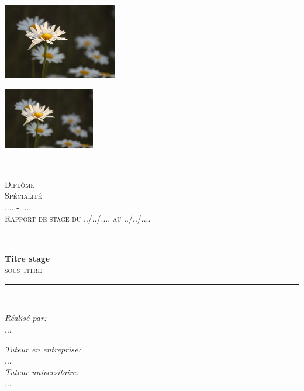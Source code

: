 \documentclass[french, a4paper, notitlepage, 12pt]{report}
\begin{document}
\begin{titlepage}
  \thispagestyle{empty}

  \begin{minipage}{0.45\textwidth}
    \begin{flushleft}
      \includegraphics[width=5cm]{img.jpg}
    \end{flushleft}
  \end{minipage}
  \begin{minipage}{0.45\textwidth}
    \begin{flushright}
      \includegraphics[width=4cm]{img.jpg}
    \end{flushright}
  \end{minipage}\\[3cm]

  \newcommand{\HRule}{\rule{\linewidth}{0.5mm}}
  \center

  \textsc{\Large Diplôme}\\
  \textsc{\Large Spécialité}\\
  \textsc{\large .... - ....}\\[2cm]
  \textsc{\Large Rapport de stage du ../../.... au ../../....}\\[.5cm]

  \HRule \\[0.4cm]
  { \huge \bfseries Titre stage}\\[0.1cm]
  \textsc{\large sous titre}\\
  \HRule \\[3cm]

  \begin{minipage}{0.4\textwidth}
    \begin{flushleft} \large
      \emph{Réalisé par:}\\
      \textsc{...}
    \end{flushleft}
  \end{minipage}
  \begin{minipage}{0.4\textwidth}
    \begin{flushright} \large
      \emph{Tuteur en entreprise:} \\
      \textsc{...} \\ [1cm]
      \emph{Tuteur universitaire:} \\
      \textsc{...} \\
    \end{flushright}
  \end{minipage}
  \vfill
  \clearpage
\end{titlepage}
\end{document}
